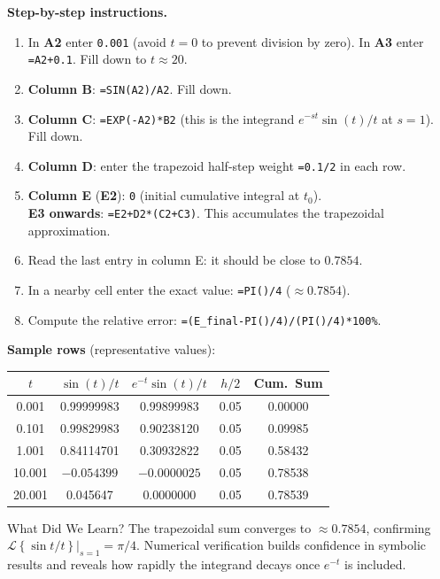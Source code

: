 \documentclass[12pt,a4paper]{article}
\begin{document}
\medskip
\noindent\textbf{Step-by-step instructions.}
\begin{enumerate}[leftmargin=2em]
  \item In \textbf{A2} enter \texttt{0.001} (avoid $t=0$ to prevent division by zero).
        In \textbf{A3} enter \texttt{=A2+0.1}. Fill down to $t\approx 20$.
  \item \textbf{Column B}: \texttt{=SIN(A2)/A2}. Fill down.
  \item \textbf{Column C}: \texttt{=EXP(-A2)*B2} (this is the integrand
        $e^{-st}\sin(t)/t$ at $s=1$). Fill down.
  \item \textbf{Column D}: enter the trapezoid half-step weight \texttt{=0.1/2}
        in each row.
  \item \textbf{Column E} (\textbf{E2}): \texttt{0} (initial cumulative integral at $t_0$).\\
        \textbf{E3 onwards}: \texttt{=E2+D2*(C2+C3)}. This accumulates the
        trapezoidal approximation.
  \item Read the last entry in column E: it should be close to $0.7854$.
  \item In a nearby cell enter the exact value: \texttt{=PI()/4} ($\approx 0.7854$).
  \item Compute the relative error: \texttt{=(E\_final-PI()/4)/(PI()/4)*100\%}.
\end{enumerate}

\noindent\textbf{Sample rows} (representative values):

\begin{center}
\begin{tabular}{@{}ccccc@{}}
\toprule
$t$ & $\sin(t)/t$ & $e^{-t}\sin(t)/t$ & $h/2$ & Cum.\ Sum \\
\midrule
0.001 & 0.99999983 & 0.99899983 & 0.05 & 0.00000 \\
0.101 & 0.99829983 & 0.90238120 & 0.05 & 0.09985 \\
1.001 & 0.84114701 & 0.30932822 & 0.05 & 0.58432 \\
10.001 & $-0.054399$ & $-0.0000025$ & 0.05 & 0.78538 \\
20.001 & 0.045647 & $0.0000000$ & 0.05 & 0.78539 \\
\bottomrule
\end{tabular}
\end{center}

\begin{learnbox}{What Did We Learn?}
The trapezoidal sum converges to $\approx 0.7854$, confirming
$\mathcal{L}\!\left\{\sin t/t\right\}\big|_{s=1} = \pi/4$.
Numerical verification builds confidence in symbolic results and reveals
how rapidly the integrand decays once $e^{-t}$ is included.
\end{learnbox}
\end{document}
